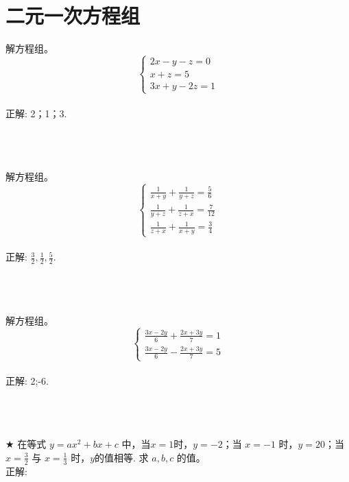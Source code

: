 \section{二元一次方程组}

\item {
    解方程组。
    \[\left\{
        \begin{array}{l}
            2x - y - z = 0 \\
            x + z = 5 \\
            3x + y - 2z = 1
        \end{array}
    \right.\]
    \ifshowSolution
        \fangsong{}
        \\
        正解: 2；1；3.
    \else
        \\ \\ \\ \\
    \fi
}

\item {
    解方程组。
    \[\left\{
        \begin{array}{l}
            \frac{1}{x+y} + \frac{1}{y+z} = \frac{5}{6} \\
            \frac{1}{y+z} + \frac{1}{z+x} = \frac{7}{12} \\
            \frac{1}{z+x} + \frac{1}{x+y} = \frac{3}{4}
        \end{array}
    \right.\]
    \ifshowSolution
        \fangsong{}
        \\
        正解: $\frac32, \frac12, \frac52$.
    \else
        \\ \\ \\ \\
    \fi
}

\item {
    解方程组。
    \[\left\{
        \begin{array}{l}
            \frac{3x-2y}{6} + \frac{2x+3y}{7} = 1 \\
            \frac{3x-2y}{6} - \frac{2x+3y}{7} = 5 
        \end{array}
    \right.\]
    \ifshowSolution
        \fangsong{}
        \\
        正解: 2;-6.
    \else
        \\ \\ \\ \\
    \fi
}

\item {
    $\bigstar$
    在等式 $y=ax^2+bx+c$ 中，当$x=1$时，$y=-2$；当 $x=-1$ 时，$y=20$；当 $x=\frac32$ 与 $x=\frac13$ 时，$y$的值相等. 求 $a,b,c$ 的值。
    \ifshowSolution
        \fangsong{}
        \\
        正解: 
    \else
        \\ \\ \\ 
    \fi
}

